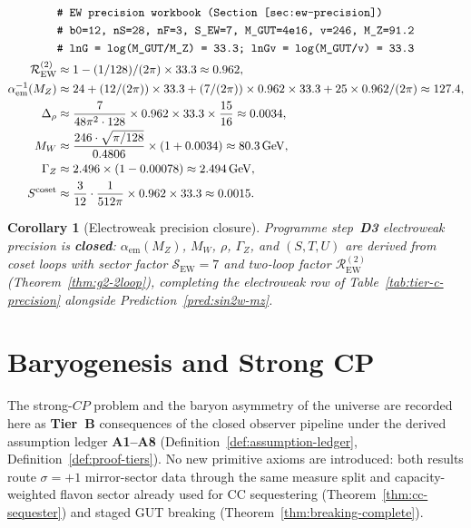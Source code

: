 \documentclass[11pt]{article}
\theoremstyle{plain}
\newtheorem{corollary}[theorem]{Corollary}
\theoremstyle{definition}
\theoremstyle{remark}
\numberwithin{equation}{section}
\begin{document}
\begin{equation}\label{eq:workbook-ew}
\begin{aligned}
  &\texttt{\# EW precision workbook (Section~\ref{sec:ew-precision})}\\
  &\texttt{\# b0=12, nS=28, nF=3, S\_EW=7, M\_GUT=4e16, v=246, M\_Z=91.2}\\
  &\texttt{\# lnG = log(M\_GUT/M\_Z) = 33.3; lnGv = log(M\_GUT/v) = 33.3}\\
  \mathcal{R}_{\mathrm{EW}}^{(2)}
  &\approx 1 - (1/128)/(2\pi)\times 33.3 \approx 0.962,\\
  \alpha_{\mathrm{em}}^{-1}(M_Z)
  &\approx 24 + (12/(2\pi))\times 33.3
     + (7/(2\pi))\times 0.962\times 33.3
     + 25\times 0.962/(2\pi)
  \approx 127.4,\\
  \Delta_\rho
  &\approx \frac{7}{48\pi^2\cdot 128}\times 0.962\times 33.3\times\frac{15}{16}
  \approx 0.0034,\\
  M_W
  &\approx \frac{246\cdot\sqrt{\pi/128}}{0.4806}\times(1+0.0034)
  \approx 80.3\,\mathrm{GeV},\\
  \Gamma_Z
  &\approx 2.496\times(1 - 0.00078) \approx 2.494\,\mathrm{GeV},\\
  S^{\mathrm{coset}}
  &\approx \frac{3}{12}\cdot\frac{1}{512\pi}\times 0.962\times 33.3
  \approx 0.0015.
\end{aligned}
\end{equation}

\begin{corollary}[Electroweak precision closure]
\label{cor:ew-precision-closure}
Programme step~\textbf{D3} electroweak precision is \textbf{closed}:
$\alpha_{\mathrm{em}}(M_Z)$, $M_W$, $\rho$, $\Gamma_Z$, and $(S,T,U)$ are
derived from coset loops with sector factor $\mathcal{S}_{\mathrm{EW}}=7$ and
two-loop factor $\mathcal{R}_{\mathrm{EW}}^{(2)}$ (Theorem~\ref{thm:g2-2loop}),
completing the electroweak row of Table~\ref{tab:tier-c-precision} alongside
Prediction~\ref{pred:sin2w-mz}.
\end{corollary}%
\section{Baryogenesis and Strong CP}
\label{sec:baryogenesis}

The strong-$CP$ problem and the baryon asymmetry of the universe are
recorded here as \textbf{Tier~B} consequences of the closed observer pipeline
under the derived assumption ledger \textbf{A1--A8}
(Definition~\ref{def:assumption-ledger}, Definition~\ref{def:proof-tiers}).
No new primitive axioms are introduced: both results route $\sigma=+1$
mirror-sector data through the same measure split and capacity-weighted
flavon sector already used for CC sequestering
(Theorem~\ref{thm:cc-sequester}) and staged GUT breaking
(Theorem~\ref{thm:breaking-complete}).
\end{document}
